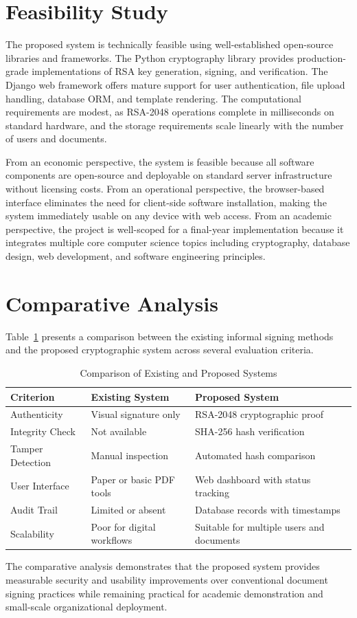 \section{Feasibility Study}

The proposed system is technically feasible using well-established open-source libraries and frameworks. The Python cryptography library provides production-grade implementations of RSA key generation, signing, and verification. The Django web framework offers mature support for user authentication, file upload handling, database ORM, and template rendering. The computational requirements are modest, as RSA-2048 operations complete in milliseconds on standard hardware, and the storage requirements scale linearly with the number of users and documents.

From an economic perspective, the system is feasible because all software components are open-source and deployable on standard server infrastructure without licensing costs. From an operational perspective, the browser-based interface eliminates the need for client-side software installation, making the system immediately usable on any device with web access. From an academic perspective, the project is well-scoped for a final-year implementation because it integrates multiple core computer science topics including cryptography, database design, web development, and software engineering principles.

\section{Comparative Analysis}

Table~\ref{tab:comparison} presents a comparison between the existing informal signing methods and the proposed cryptographic system across several evaluation criteria.

\begin{table}[H]
\centering
\caption{Comparison of Existing and Proposed Systems}
\label{tab:comparison}
\begin{tabularx}{\textwidth}{|l|X|X|}
\hline
\textbf{Criterion} & \textbf{Existing System} & \textbf{Proposed System} \\
\hline
Authenticity & Visual signature only & RSA-2048 cryptographic proof \\
\hline
Integrity Check & Not available & SHA-256 hash verification \\
\hline
Tamper Detection & Manual inspection & Automated hash comparison \\
\hline
User Interface & Paper or basic PDF tools & Web dashboard with status tracking \\
\hline
Audit Trail & Limited or absent & Database records with timestamps \\
\hline
Scalability & Poor for digital workflows & Suitable for multiple users and documents \\
\hline
\end{tabularx}
\end{table}

The comparative analysis demonstrates that the proposed system provides measurable security and usability improvements over conventional document signing practices while remaining practical for academic demonstration and small-scale organizational deployment.
